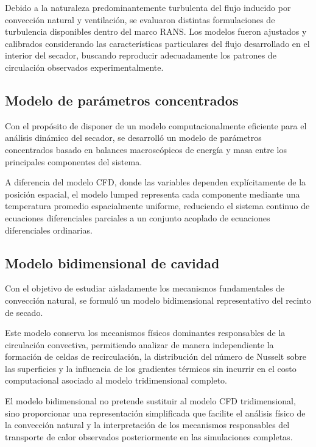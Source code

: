 Debido a la naturaleza predominantemente turbulenta del flujo inducido por convección natural y ventilación, se evaluaron distintas formulaciones de turbulencia disponibles dentro del marco RANS. Los modelos fueron ajustados y calibrados considerando las características particulares del flujo desarrollado en el interior del secador, buscando reproducir adecuadamente los patrones de circulación observados experimentalmente.

\subsection{Modelo de parámetros concentrados}
Con el propósito de disponer de un modelo computacionalmente eficiente para el análisis dinámico del secador, se desarrolló un modelo de parámetros concentrados basado en balances macroscópicos de energía y masa entre los principales componentes del sistema.

A diferencia del modelo CFD, donde las variables dependen explícitamente de la posición espacial, el modelo lumped representa cada componente mediante una temperatura promedio espacialmente uniforme, reduciendo el sistema continuo de ecuaciones diferenciales parciales a un conjunto acoplado de ecuaciones diferenciales ordinarias.

\subsection{Modelo bidimensional de cavidad}
Con el objetivo de estudiar aisladamente los mecanismos fundamentales de convección natural, se formuló un modelo bidimensional representativo del recinto de secado.

Este modelo conserva los mecanismos físicos dominantes responsables de la circulación convectiva, permitiendo analizar de manera independiente la formación de celdas de recirculación, la distribución del número de Nusselt sobre las superficies y la influencia de los gradientes térmicos sin incurrir en el costo computacional asociado al modelo tridimensional completo.

El modelo bidimensional no pretende sustituir al modelo CFD tridimensional, sino proporcionar una representación simplificada que facilite el análisis físico de la convección natural y la interpretación de los mecanismos responsables del transporte de calor observados posteriormente en las simulaciones completas.

